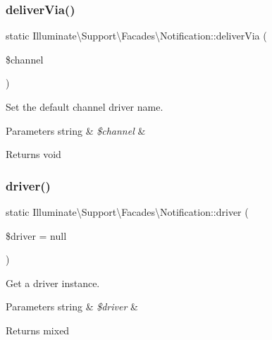 \subsubsection{\texorpdfstring{deliver\+Via()}{deliverVia()}}
{\footnotesize\ttfamily static Illuminate\textbackslash{}\+Support\textbackslash{}\+Facades\textbackslash{}\+Notification\+::deliver\+Via (\begin{DoxyParamCaption}\item[{}]{\$channel }\end{DoxyParamCaption})\hspace{0.3cm}{\ttfamily [static]}}

Set the default channel driver name.


\begin{DoxyParams}[1]{Parameters}
string & {\em \$channel} & \\
\hline
\end{DoxyParams}
\begin{DoxyReturn}{Returns}
void 
\end{DoxyReturn}
\mbox{\label{class_illuminate_1_1_support_1_1_facades_1_1_notification_a47a033fe464871a4d6a6279a157effcf}} 
\subsubsection{\texorpdfstring{driver()}{driver()}}
{\footnotesize\ttfamily static Illuminate\textbackslash{}\+Support\textbackslash{}\+Facades\textbackslash{}\+Notification\+::driver (\begin{DoxyParamCaption}\item[{}]{\$driver = {\ttfamily null} }\end{DoxyParamCaption})\hspace{0.3cm}{\ttfamily [static]}}

Get a driver instance.


\begin{DoxyParams}[1]{Parameters}
string & {\em \$driver} & \\
\hline
\end{DoxyParams}
\begin{DoxyReturn}{Returns}
mixed 
\end{DoxyReturn}
\mbox{\label{class_illuminate_1_1_support_1_1_facades_1_1_notification_a584448fd4e1ce7434b76b0a8dd274352}} 
